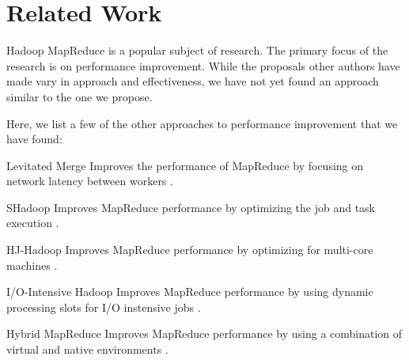\section{Related Work}
\label{section:relatedwork}
Hadoop MapReduce is a popular subject of research. The primary focus of the research
is on performance improvement. While the proposals other authors have made vary in
approach and effectiveness, we have not yet found an approach similar to the one
we propose.

Here, we list a few of the other approaches to performance improvement that we have found:
\begin{description}
  \item{Levitated Merge} Improves the performance of MapReduce by focusing on network latency between workers \cite{LevitatedMerge}.
  \item{SHadoop} Improves MapReduce performance by optimizing the job and task execution \cite{SHadoop}.
  \item{HJ-Hadoop} Improves MapReduce performance by optimizing for multi-core machines \cite{HJHadoop}.
  \item{I/O-Intensive Hadoop} Improves MapReduce performance by using dynamic processing slots for I/O instensive jobs \cite{IOIntensive}.
  \item{Hybrid MapReduce} Improves MapReduce performance by using a combination of virtual and native environments \cite{HybricMR}.
\end{description}